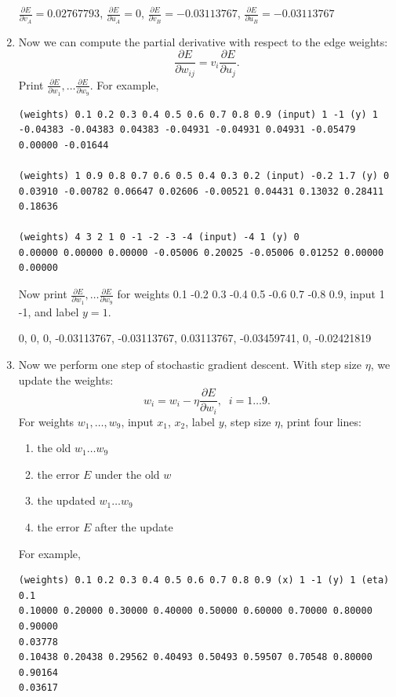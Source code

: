 \documentclass[a4paper]{article}
\theoremstyle{definition}
\newenvironment{soln}{
    \leavevmode\color{blue}\ignorespaces
}{}
\begin{document}
\begin{enumerate}
\begin{soln}
$\frac{\partial E}{\partial v_A} = 0.02767793$, $\frac{\partial E}{\partial u_A} = 0$, $\frac{\partial E}{\partial v_B} = -0.03113767$,  $\frac{\partial E}{\partial u_B} = -0.03113767$ 

\end{soln}

\item
Now we can compute the partial derivative with respect to the edge weights:
$$\frac{\partial E}{\partial w_{ij}} = v_i \frac{\partial E}{\partial u_j}.$$
Print $\frac{\partial E}{\partial w_1}, \ldots \frac{\partial E}{\partial w_9}$. 
For example,
\begin{verbatim}
(weights) 0.1 0.2 0.3 0.4 0.5 0.6 0.7 0.8 0.9 (input) 1 -1 (y) 1
-0.04383 -0.04383 0.04383 -0.04931 -0.04931 0.04931 -0.05479 0.00000 -0.01644

(weights) 1 0.9 0.8 0.7 0.6 0.5 0.4 0.3 0.2 (input) -0.2 1.7 (y) 0
0.03910 -0.00782 0.06647 0.02606 -0.00521 0.04431 0.13032 0.28411 0.18636

(weights) 4 3 2 1 0 -1 -2 -3 -4 (input) -4 1 (y) 0
0.00000 0.00000 0.00000 -0.05006 0.20025 -0.05006 0.01252 0.00000 0.00000
\end{verbatim}
Now print $\frac{\partial E}{\partial w_1}, \ldots \frac{\partial E}{\partial w_9}$
for weights 0.1 -0.2 0.3 -0.4 0.5 -0.6 0.7 -0.8 0.9, input 1 -1, and label $y=1$.

\begin{soln}
0, 0, 0, -0.03113767, -0.03113767,  0.03113767, -0.03459741, 0, -0.02421819

\end{soln}

\item
Now we perform one step of stochastic gradient descent.  With step size $\eta$, we update the weights:
$$w_i = w_i - \eta \frac{\partial E}{\partial w_i}, \;\; i=1\ldots 9.$$
For weights $w_1, \ldots, w_9$, input $x_1$, $x_2$, label $y$, step size $\eta$,
print four lines:
\begin{enumerate}
\item the old $w_1 \ldots w_9$
\item the error $E$ under the old $w$
\item the updated $w_1 \ldots w_9$
\item the error $E$ after the update
\end{enumerate}
For example,
\begin{verbatim}
(weights) 0.1 0.2 0.3 0.4 0.5 0.6 0.7 0.8 0.9 (x) 1 -1 (y) 1 (eta) 0.1
0.10000 0.20000 0.30000 0.40000 0.50000 0.60000 0.70000 0.80000 0.90000
0.03778
0.10438 0.20438 0.29562 0.40493 0.50493 0.59507 0.70548 0.80000 0.90164
0.03617


\end{verbatim}
\end{enumerate}
\end{document}
